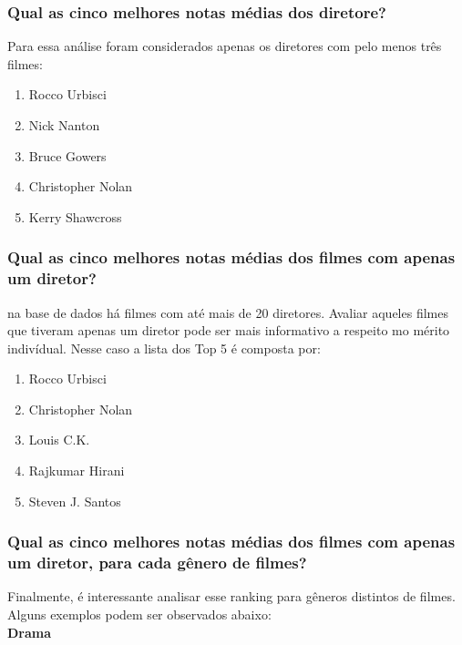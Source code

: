 \documentclass[a4paper, 12pt]{article} %
\begin{document}
\subsubsection{Qual as cinco melhores notas médias dos diretore?}

Para essa análise foram considerados apenas os diretores com pelo menos três filmes:

\begin{enumerate}[topsep=0pt,partopsep=0pt]
    \item Rocco Urbisci
    \item Nick Nanton
    \item Bruce Gowers
    \item Christopher Nolan
    \item Kerry Shawcross
\end{enumerate}



\subsubsection{Qual as cinco melhores notas médias dos filmes com apenas um diretor?}

na base de dados há filmes com até mais de 20 diretores. Avaliar aqueles filmes que tiveram apenas um diretor pode ser mais informativo a respeito mo mérito indivídual. Nesse caso a lista dos Top 5 é composta por:\\

\begin{enumerate}[topsep=0pt,partopsep=0pt]
    \item Rocco Urbisci
    \item Christopher Nolan
    \item Louis C.K.
    \item Rajkumar Hirani
    \item Steven J. Santos
\end{enumerate}

\subsubsection{Qual as cinco melhores notas médias dos filmes com apenas um diretor, para cada gênero de filmes?}

Finalmente, é interessante analisar esse ranking para gêneros distintos de filmes. Alguns exemplos podem ser observados abaixo:\\

\textbf{Drama}
\newline
\end{document}
